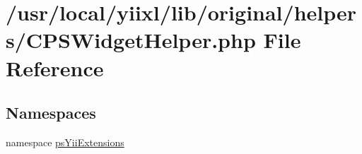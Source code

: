 \hypertarget{CPSWidgetHelper_8php}{
\section{/usr/local/yiixl/lib/original/helpers/CPSWidgetHelper.php File Reference}
\label{CPSWidgetHelper_8php}
}
\subsection*{Namespaces}
\begin{DoxyCompactItemize}
\item 
namespace \hyperlink{namespacepsYiiExtensions}{psYiiExtensions}
\end{DoxyCompactItemize}
